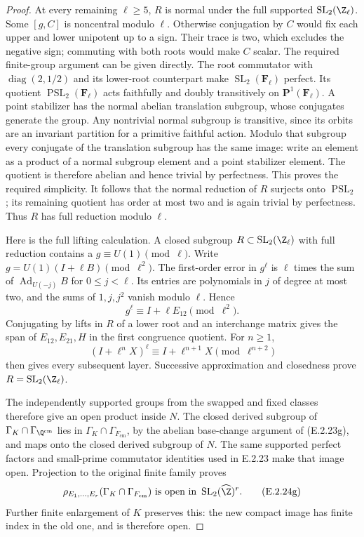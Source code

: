 \begin{proof}
At every remaining \(\ell\geq5\), \(R\) is normal
under the full supported \(\operatorname{SL}_2(\Z_\ell)\).
Some \([g,C]\) is noncentral modulo \(\ell\).
Otherwise conjugation by \(C\) would fix each upper and
lower unipotent up to a sign. Their trace is two, which
excludes the negative sign; commuting with both roots
would make \(C\) scalar.
The required finite-group argument can be given directly.
The root commutator with \(\operatorname{diag}(2,1/2)\)
and its lower-root counterpart make
\(\operatorname{SL}_2(\mathbf F_\ell)\) perfect.
Its quotient \(\operatorname{PSL}_2(\mathbf F_\ell)\)
acts faithfully and doubly transitively on
\(\mathbf P^1(\mathbf F_\ell)\). A point stabilizer
has the normal abelian translation subgroup, whose
conjugates generate the group. Any nontrivial normal
subgroup is transitive, since its orbits are an invariant
partition for a primitive faithful action. Modulo that
subgroup every conjugate of the translation subgroup has
the same image: write an element as a product of a normal
subgroup element and a point stabilizer element.
The quotient is therefore abelian and hence trivial by
perfectness. This proves the required simplicity.
It follows that the normal reduction of \(R\) surjects
onto \(\operatorname{PSL}_2\); its remaining quotient
has order at most two and is again trivial by perfectness.
Thus \(R\) has full reduction modulo \(\ell\).

Here is the full lifting calculation. A closed subgroup
\(R\subset\operatorname{SL}_2(\Z_\ell)\) with full
reduction contains a \(g\equiv U(1)\pmod\ell\).
Write \(g=U(1)(I+\ell B)\pmod{\ell^2}\).
The first-order error in \(g^\ell\) is \(\ell\)
times the sum of \(\operatorname{Ad}_{U(-j)}B\) for
\(0\leq j<\ell\). Its entries are polynomials in
\(j\) of degree at most two, and the sums of
\(1,j,j^2\) vanish modulo \(\ell\). Hence
\[
 g^\ell\equiv I+\ell E_{12}\pmod{\ell^2}.
 \tag{E.2.24f}
\]
Conjugating by lifts in \(R\) of a lower root and an
interchange matrix gives the span of
\(E_{12},E_{21},H\) in the first congruence quotient.
For \(n\geq1\),
\[
 (I+\ell^nX)^\ell
       \equiv I+\ell^{n+1}X\pmod{\ell^{n+2}}
\]
then gives every subsequent layer. Successive approximation
and closedness prove \(R=\operatorname{SL}_2(\Z_\ell)\).

The independently supported groups from the swapped and
fixed classes therefore give an open product inside \(N\).
The closed derived subgroup of
\(\Gamma_K\cap\Gamma_{\Q^{\mathrm{cm}}}\) lies in
\(\Gamma_K\cap\Gamma_{F_{\mathrm{cm}}}\), by the
abelian base-change argument of (E.2.23g), and maps onto
the closed derived subgroup of \(N\).
The same supported perfect factors and small-prime
commutator identities used in E.2.23 make that image open.
Projection to the original finite family proves
\[
 \rho_{E_1,\ldots,E_r}
       (\Gamma_K\cap\Gamma_{F_{\mathrm{cm}}})
   \text{ is open in }
       \operatorname{SL}_2(\widehat\Z)^r.
 \tag{E.2.24g}
\]
Further finite enlargement of \(K\) preserves this:
the new compact image has finite index in the old one,
and is therefore open.


\end{proof}
